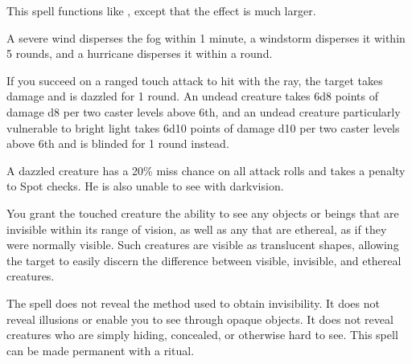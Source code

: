 \begin{spelleffect}
  This spell functions like , except that the effect is much larger.
\end{spelleffect}
\begin{spellnotes}
  A severe wind disperses the fog within 1 minute, a windstorm disperses it within 5 rounds, and a hurricane disperses it within a round.
\end{spellnotes}

\spellrng{\rngclose}
\begin{spelleffect}
  If you succeed on a ranged touch attack to hit with the ray, the target takes damage and is dazzled for 1 round. An undead creature takes 6d8 points of damage \add d8 per two caster levels above 6th, and an undead creature particularly vulnerable to bright light takes 6d10 points of damage \add d10 per two caster levels above 6th and is blinded for 1 round instead.
\end{spelleffect}
\begin{spellnotes}
  A dazzled creature has a 20\% miss chance on all attack rolls and takes a  penalty to Spot checks. He is also unable to see with darkvision.
\end{spellnotes}

\begin{spelleffect}
  You grant the touched creature the ability to see any objects or beings that are invisible within its range of vision, as well as any that are ethereal, as if they were normally visible. Such creatures are visible as translucent shapes, allowing the target to easily discern the difference between visible, invisible, and ethereal creatures.
\end{spelleffect}
\begin{spellnotes}
  The spell does not reveal the method used to obtain invisibility. It does not reveal illusions or enable you to see through opaque objects. It does not reveal creatures who are simply hiding, concealed, or otherwise hard to see.
This spell can be made permanent with a  ritual.
\end{spellnotes}

